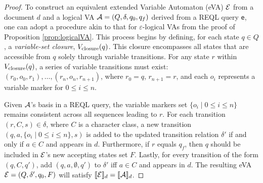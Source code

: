 \begin{proof}
	To construct an equivalent extended Variable Automaton (eVA) $\mathcal{E}$ from a
	document $d$ and a logical VA $\mathcal{A} = (Q, \delta, q_0, q_f)$ derived from a
	REQL query \texttt{e}, one can adopt a procedure akin to that for
	$\varepsilon$-logical VAs from the proof of Proposition
	\ref{prop:logicalVA}. This process begins by defining, for each state $q \in
	Q$, a \emph{variable-set closure}, $V_{\text{closure}}(q)$. This closure encompasses
	all states that are accessible from $q$ solely through variable transitions.
	For any state $r$ within $V_{\text{closure}}(q)$, a series of variable transitions
	must exist: $(r_0, o_0, r_1), \ldots, (r_n, o_n, r_{n+1})$, where $r_0 = q$,
	$r_{n+1} = r$, and each $o_i$ represents a variable marker for $0 \leq i
	\leq n$. 
	
	Given $\mathcal{A}$'s basis in a REQL query, 
	the variable markers set
	$\{o_i \mid 0 \leq i \leq n\}$ remains consistent across all sequences
	leading to $r$. For each transition $(r, C, s) \in \delta$, where $C$ is a
	character class, a new transition $(q, a, \{o_i \mid 0 \leq i \leq n\}, s)$
	is added to the updated transition relation $\delta'$ if and only if $a \in
	C$ and appears in $d$.
	Furthermore, if $r$ equals $q_f$, then $q$ should be
	included in $\mathcal{E}$'s new accepting states set $F$. 
	Lastly, for every
	transition of the form $(q, C, q')$, add $(q, a, \emptyset, q')$ to
	$\delta'$ iff $a \in C$ and appears in $d$. 
	The resulting eVA $\mathcal{E} = (Q,
	\delta', q_0, F)$ will satisfy $\llbracket\mathcal{E}\rrbracket_d = \llbracket\mathcal{A}\rrbracket_d$.
\end{proof}


